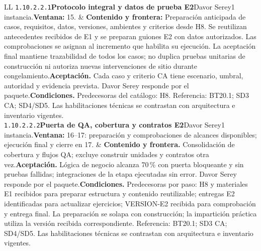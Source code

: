 \begin{longtable}{L{\tabcolsep\relax}L{\tabcolsep\relax}}
\texttt{1.\allowbreak{}10.\allowbreak{}2.\allowbreak{}2.\allowbreak{}1}\newline{}\textbf{Protocolo integral y datos de prueba E2}\newline{}Davor Serey\newline{}1 instancia.\newline{}\textbf{Ventana:} 15. & \textbf{Contenido y frontera:} Preparación anticipada de casos, requisitos, datos, versiones, ambientes y criterios desde H8. Se reutilizan antecedentes recibidos de E1 y se preparan guiones E2 con datos autorizados. Las comprobaciones se asignan al incremento que habilita su ejecución. La aceptación final mantiene trazabilidad de todos los casos; no duplica pruebas unitarias de construcción ni autoriza nuevas intervenciones de sitio durante congelamiento.\newline{}\textbf{Aceptación.} Cada caso y criterio CA tiene escenario, umbral, autoridad y evidencia prevista. Davor Serey responde por el paquete.\newline{}\textbf{Condiciones.} Predecesoras del catálogo: H8. Referencia: BT20.1; SD3 CA; SD4/SD5. Las habilitaciones técnicas se contrastan con arquitectura e inventario vigentes.\\\hline
\texttt{1.\allowbreak{}10.\allowbreak{}2.\allowbreak{}2.\allowbreak{}2}\newline{}\textbf{Puerta de QA, cobertura y contratos E2}\newline{}Davor Serey\newline{}1 instancia.\newline{}\textbf{Ventana:} 16--17: preparación y comprobaciones de alcances disponibles; ejecución final y cierre en 17. & \textbf{Contenido y frontera.} Consolidación de cobertura y flujos QA; excluye construir unidades y contratos otra vez.\newline{}\textbf{Aceptación.} Lógica de negocio alcanza 70\,\% con puerta bloqueante y sin pruebas fallidas; integraciones de la etapa ejecutadas sin error. Davor Serey responde por el paquete.\newline{}\textbf{Condiciones.} Predecesoras por paso: H8 y materiales E1 recibidos para preparar estructura y contenido reutilizable; entregas E2 identificadas para actualizar ejercicios; VERSION-E2 recibida para comprobación y entrega final. La preparación se solapa con construcción; la impartición práctica utiliza la versión recibida correspondiente.
Referencia: BT20.1; SD3 CA; SD4/SD5. Las habilitaciones técnicas se contrastan con arquitectura e inventario vigentes.\\\hline

\end{longtable}
